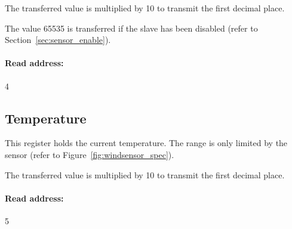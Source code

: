 The transferred value is multiplied by 10 to transmit the first decimal place.

The value 65535 is transferred if the slave has been disabled (refer to Section~\ref{sec:sensor_enable}).

\paragraph{Read address:} 4

\subsection{Temperature}
This register holds the current temperature. The range is only limited by the sensor (refer to Figure~\ref{fig:windsensor_spec}).

The transferred value is multiplied by 10 to transmit the first decimal place.

\paragraph{Read address:} 5

\newpage